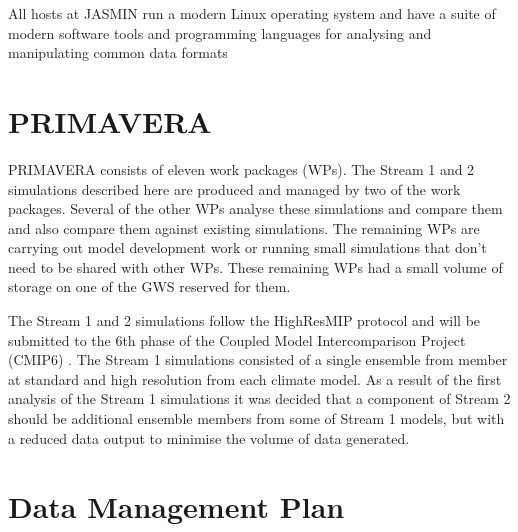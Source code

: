 \documentclass[gmd, manuscript]{copernicus}
\begin{document}
All hosts at JASMIN run a modern Linux operating system and have a suite of modern software tools and programming languages for analysing and manipulating common data formats

\section{PRIMAVERA}

PRIMAVERA consists of eleven work packages (WPs). The Stream 1 and 2 simulations described here are produced and managed by two of the work packages. Several of the other WPs analyse these simulations and compare them and also compare them against existing simulations. The remaining WPs are carrying out model development work or running small simulations that don't need to be shared with other WPs. These remaining WPs had a small volume of storage on one of the GWS reserved for them. 

The Stream 1 and 2 simulations follow the HighResMIP protocol and will be submitted to the 6th phase of the Coupled Model Intercomparison Project (CMIP6) \citep{Eyring2016}. The Stream 1 simulations consisted of a single ensemble from member at standard and high resolution from each climate model. As a result of the first analysis of the Stream 1 simulations it was decided that a component of Stream 2 should be additional ensemble members from some of Stream 1 models, but with a reduced data output to minimise the volume of data generated.

\section{Data Management Plan}

\end{document}
